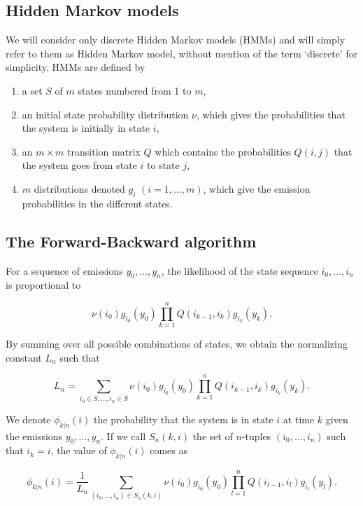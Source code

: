 \documentclass[12pt]{article}
\begin{document}
\begin{appendices}
    \section{Hidden Markov models}

    We will consider only discrete Hidden Markov models (HMMs) and
    will simply refer to them as Hidden Markov model, without mention
    of the term `discrete' for simplicity.
    HMMs are defined by 

    \begin{enumerate}
      \item a set $S$ of $m$ states numbered from 1 to $m$,
      \item an initial state probability distribution $\nu$, which
      gives the probabilities that the system is initially in state $i$,
      \item an $m \times m$ transition matrix $Q$ which contains the
      probabilities $Q(i,j)$ that the system goes from state $i$ to
      state $j$,
      \item $m$ distributions denoted $g_i$ $(i = 1, \ldots, m)$, which
      give the emission probabilities in the different states.
    \end{enumerate}

    \subsection{The Forward-Backward algorithm}

    For a sequence of emissions $y_0, \ldots, y_n$, the likelihood
    of the state sequence $i_0, \ldots, i_n$ is proportional to

    $$ \nu(i_0)g_{i_0}(y_0)
       \prod_{k=1}^n Q(i_{k-1},i_k)g_{i_k}(y_k). $$

    By summing over all possible combinations of states, we obtain
    the normalizing constant $L_n$ such that

    \begin{equation}
       L_n = \sum_{i_0 \in S, \ldots, i_n \in S} \nu(i_0)g_{i_0}(y_0)
       \prod_{k=1}^n Q(i_{k-1},i_k)g_{i_k}(y_k).
    \end{equation}

    We denote $\phi_{k|n}(i)$ the probability that the system is in
    state $i$ at time $k$ given the emissions $y_0, \ldots, y_n$. If
    we call $S_n(k,i)$ the set of $n$-tuples $(i_0, \ldots, i_n)$
    such that $i_k = i$, the value of $\phi_{k|n}(i)$ comes as

    $$ \phi_{k|n}(i) = \frac{1}{L_n}
       \sum_{(i_0, \ldots, i_n) \in S_n(k,i)}
       \nu(i_0)g_{i_0}(y_0) \prod_{l=1}^n Q(i_{l-1}, i_l)
       g_{i_l}(y_l). $$


\end{appendices}
\end{document}
